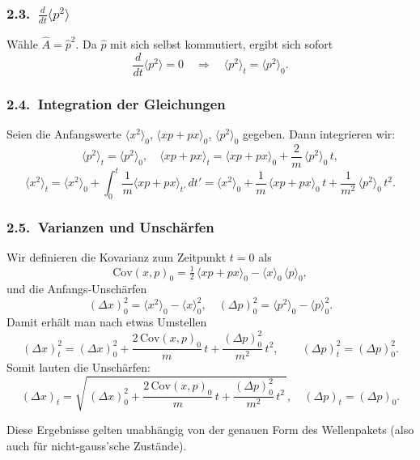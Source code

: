 \documentclass[a4paper,12pt]{article}
\begin{document}
\subsubsection*{2.3.\ \(\frac{d}{dt}\langle p^2\rangle\)}
Wähle \(\hat A=\hat p^2\). Da \(\hat p\) mit sich selbst kommutiert,
ergibt sich sofort
\[
  \frac{d}{dt}\langle p^2\rangle = 0
  \quad\Longrightarrow\quad
  \langle p^2\rangle_t = \langle p^2\rangle_0.
\]

\subsubsection*{2.4.\ Integration der Gleichungen}

Seien die Anfangswerte
\(\langle x^2\rangle_0\), \(\langle x p + p x\rangle_0\),
\(\langle p^2\rangle_0\) gegeben. Dann integrieren wir:
\[
  \langle p^2\rangle_t = \langle p^2\rangle_0,
  \quad
  \langle x p + p x\rangle_t
  = \langle x p + p x\rangle_0
    + \frac{2}{m}\,\langle p^2\rangle_0\,t,
\]
\[
  \langle x^2\rangle_t
  = \langle x^2\rangle_0
    + \int_0^t \frac{1}{m}\langle x p + p x\rangle_{t'}\,dt'
  = \langle x^2\rangle_0
    + \frac{1}{m}\,\langle x p + p x\rangle_0\,t
    + \frac{1}{m^2}\,\langle p^2\rangle_0\,t^2.
\]

\subsubsection*{2.5.\ Varianzen und Unschärfen}

Wir definieren die Kovarianz zum Zeitpunkt \(t=0\) als
\[
  \mathrm{Cov}(x,p)_0
  = \tfrac12\,\langle x p + p x\rangle_0
    - \langle x\rangle_0\,\langle p\rangle_0,
\]
und die Anfangs‐Unschärfen
\[
  (\Delta x)^2_0 = \langle x^2\rangle_0 - \langle x\rangle_0^2,
  \quad
  (\Delta p)^2_0 = \langle p^2\rangle_0 - \langle p\rangle_0^2.
\]
Damit erhält man nach etwas Umstellen
\[
  (\Delta x)^2_t
  = (\Delta x)^2_0
    + \frac{2\,\mathrm{Cov}(x,p)_0}{m}\,t
    + \frac{(\Delta p)^2_0}{m^2}\,t^2,
  \qquad
  (\Delta p)^2_t
  = (\Delta p)^2_0.
\]
Somit lauten die Unschärfen:
\[
  \boxed{
    (\Delta x)_t
    = \sqrt{\,(\Delta x)^2_0
      + \frac{2\,\mathrm{Cov}(x,p)_0}{m}\,t
      + \frac{(\Delta p)^2_0}{m^2}\,t^2\,},
    \quad
    (\Delta p)_t
    = (\Delta p)_0.
  }
\]

\bigskip

Diese Ergebnisse gelten unabhängig von der genauen Form des Wellenpakets
(also auch für nicht‐gauss’sche Zustände).
\end{document}
